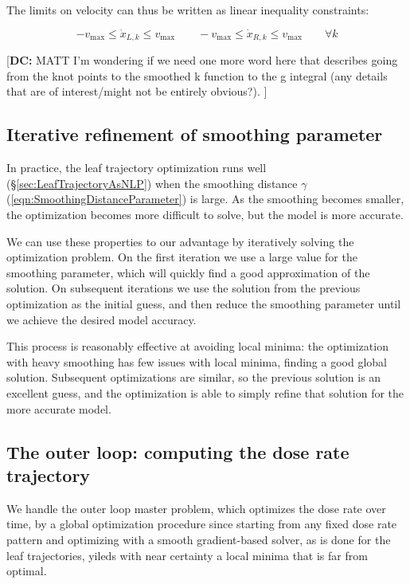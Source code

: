 \documentclass[12pt]{article}
\newcommand{\DCcomment}[1]{{\color{magenta}\par {[{\bf DC: } { #1}} ] \\    }}
\begin{document}
The limits on velocity can thus be written as linear inequality constraints:

\begin{equation}
  -v_\text{max} \leq \dot{x}_{L, k} \leq v_\text{max}
  \quad \quad
  -v_\text{max} \leq \dot{x}_{R, k} \leq v_\text{max}
  \quad \quad \forall k
  \label{eqn:VelocityLimits}
\end{equation}

\DCcomment{MATT I'm wondering if we need one more word here that describes going from
the knot points to the smoothed k function to the g integral (any details that are of interest/might
not be entirely obvious?).}

\subsection{Iterative refinement of smoothing parameter}

In practice, the leaf trajectory optimization runs well (\S\ref{sec:LeafTrajectoryAsNLP})
when the smoothing distance $\gamma$ (\ref{eqn:SmoothingDistanceParameter}) is large.
As the smoothing becomes smaller, the optimization becomes more difficult to solve,
but the model is more accurate.

We can use these properties to our advantage by iteratively solving the optimization problem.
On the first iteration we use a large value for the smoothing parameter,
which will quickly find a good approximation of the solution.
On subsequent iterations we use the solution from the previous optimization as the initial guess,
and then reduce the smoothing parameter until we achieve the desired model accuracy.

This process is reasonably effective at avoiding local minima:
the optimization with heavy smoothing has few issues with local minima, finding a good global solution.
Subsequent optimizations are similar, so the previous solution is an excellent guess,
and the optimization is able to simply refine that solution for the more accurate model.


\subsection{The outer loop: computing the dose rate trajectory}
We handle the outer loop master problem, which optimizes the dose rate over time, by a
global optimization procedure since starting from any fixed dose rate pattern and optimizing with
a smooth gradient-based solver, as is done for the leaf trajectories, yileds with near certainty
a local minima that is far from optimal.
\end{document}
